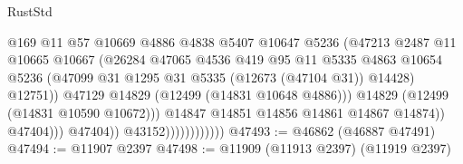\begin{lexlean}{RustStd}
\begin{coremodule}
                                              @169
                                              @11
                                              @57
                                              @10669
                                              @4886
                                              @4838
                                              @5407
                                              @10647
                                              @5236
                                              (@47213
                                                @2487
                                                @11
                                                @10665
                                                @10667
                                                (@26284
                                                  @47065
                                                  @4536
                                                  @419
                                                  @95
                                                  @11
                                                  @5335
                                                  @4863
                                                  @10654
                                                  @5236
                                                  (@47099
                                                    @31
                                                    @1295
                                                    @31
                                                    @5335
                                                    (@12673 (@47104 @31))
                                                    @14428)
                                                  @12751))
                                              @47129
                                              @14829
                                              (@12499 (@14831 @10648 @4886)))
                                            @14829
                                            (@12499 (@14831 @10590 @10672)))
                                          @14847
                                          @14851
                                          @14856
                                          @14861
                                          @14867
                                          @14874))
                                      @47404)))
                                @47404))
                            @43152))))))))))))
@47493 := @46862 (@46887 @47491)
@47494 := @11907 @2397
@47498 := @11909 (@11913 @2397) (@11919 @2397)

\end{coremodule}
\end{lexlean}
